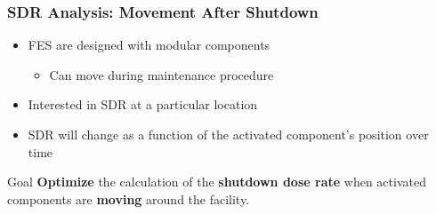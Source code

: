 \documentclass{beamer}
\begin{document}
%

\begin{frame}
\frametitle{SDR Analysis: Movement After Shutdown}
	\begin{itemize}
		\item{FES are designed with modular components}
	\begin{itemize}
		\item{Can move during maintenance procedure}
	\end{itemize}
		\item{Interested in SDR at a particular
					location}
		\item{SDR will change as a function of the
					activated component's position over
					time}
	\end{itemize}
	\begin{center}
	\end{center}
\end{frame}

\begin{frame}{Goal}
	\textbf{Optimize} the %
	calculation of the \textbf{shutdown dose rate}
        when activated components are
	\textbf{moving} around the facility.
\end{frame}

\end{document}
